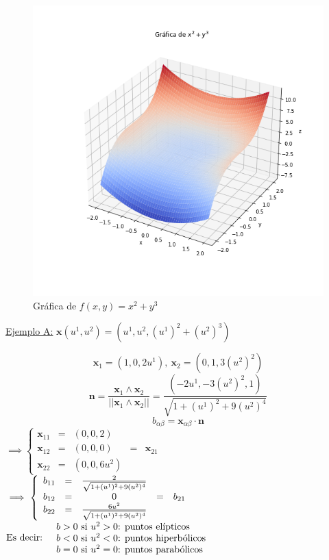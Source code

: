 \WFclear
\begin{mybox}
\begin{figure}
        \centering
        \includegraphics[scale=.3]{FOTOS/ejemplo3_A.png}
        \caption*{Gráfica de $f(x,y)=x^2+y^3$}
    \end{figure}
 \underline{Ejemplo A:} $\mathbf{x}(u^1,u^2)=(u^1,u^2,(u^1)^2+(u^2)^3)$
    
    $$\mathbf{x}_1=(1,0,2u^1),\ \mathbf{x}_2=(0,1,3(u^2)^2)$$
    $$
    \mathbf{n}=\frac{\mathbf{x}_1\wedge \mathbf{x}_2}{||\mathbf{x}_1\wedge \mathbf{x}_2||}=\frac{(-2u^1,-3(u^2)^2,1)}{\sqrt{1+(u^1)^2+9(u^2)^4}}
    $$
    $$
    b_{\alpha \beta }=\mathbf{x}_{\alpha \beta }\cdot \mathbf{n}
    $$
    $\implies 
    \left \{ \begin{array}{ccccc}
         \mathbf{x}_{11}&=&(0,0,2)&&  \\
         \mathbf{x}_{12}&=&(0,0,0)&=&\mathbf{x}_{21}\\
         \mathbf{x}_{22}&=&(0,0,6u^2)&&
    \end{array} \right .
    $\\
    $
    \implies \left \{ \begin{array}{ccccc}
         b_{11}&=&\frac{2}{\sqrt{1+(u^1)^2+9(u^2)^4}}&&  \\
         b_{12}&=&0&=&b_{21}\\
         b_{22}&=&\frac{6u^2}{\sqrt{1+(u^1)^2+9(u^2)^4}}&&\\
    \end{array} \right .\\
    $\WFclear$  \text{Es decir: \quad \parbox{8cm}{$b>0$ si $u^2>0$: puntos elípticos\\
                                                                 $b<0$ si $u^2<0$: puntos hiperbólicos\\
                                                                 $b=0$ si $u^2=0$: puntos parabólicos}}$
\end{mybox}


